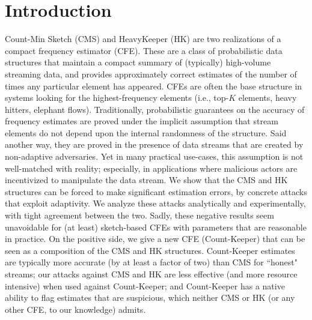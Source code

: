 \chapter{Introduction}



Count-Min Sketch (CMS) and HeavyKeeper (HK) are two realizations of a compact frequency estimator (CFE).  These are a class of probabilistic data structures that maintain a compact summary of (typically) high-volume streaming data, and provides approximately correct estimates of the number of times any particular element has appeared. CFEs are often the base structure in systems looking for the highest-frequency elements (i.e., top-$K$ elements, heavy hitters, elephant flows).  Traditionally, probabilistic guarantees on the accuracy of frequency estimates are proved under the implicit assumption that stream elements do not depend upon the internal randomness of the structure. Said another way, they are proved in the presence of data streams that are created by non-adaptive adversaries.  Yet in many practical use-cases, this assumption is not well-matched with reality; especially, in applications where malicious actors are incentivized to manipulate the data stream.  We show that the CMS and HK structures can be forced to make significant estimation errors, by concrete attacks that exploit adaptivity.  We analyze these attacks analytically and experimentally, with tight agreement between the two.  Sadly, these negative results seem unavoidable for (at least) sketch-based CFEs with parameters that are reasonable in practice. On the positive side, we give a new CFE (Count-Keeper) that can be seen as a composition of the CMS and HK structures. Count-Keeper estimates are typically more accurate (by at least a factor of two) than CMS for ``honest" streams; our attacks against CMS and HK are less effective (and more resource intensive) when used against Count-Keeper; and Count-Keeper has a native ability to flag estimates that are suspicious, which neither CMS or HK (or any other CFE, to our knowledge) admits.

